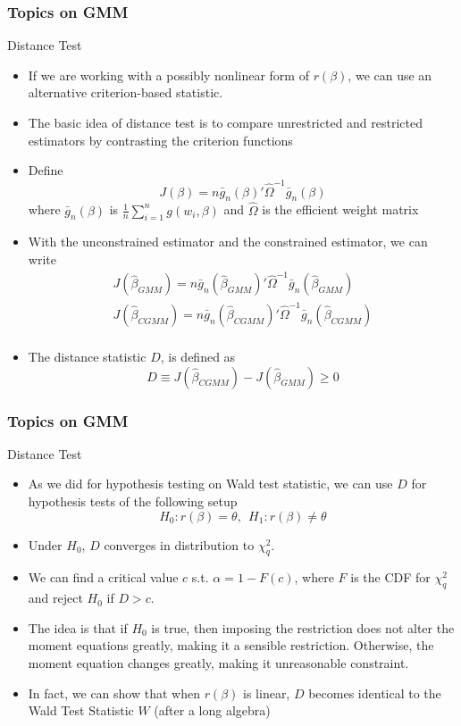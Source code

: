 \documentclass{beamer}
\begin{document}
\begin{frame}
\frametitle{Topics on GMM}
Distance Test
\begin{itemize}
\item  If we are working with a possibly nonlinear form of $r(\beta)$, we can use an alternative criterion-based statistic. 
\item The basic idea of distance test is to compare unrestricted and restricted estimators by contrasting the criterion functions
\item Define
\[
J(\beta)=n\bar{g}_n(\beta)'\widehat{\Omega}^{-1}\bar{g}_n(\beta)
\]
where $\bar{g}_n(\beta)$ is $\frac{1}{n}\sum_{i=1}^n g(w_i,\beta)$ and $\widehat{\Omega}$ is the efficient weight matrix
\item With the unconstrained estimator and the constrained estimator, we can write
\small{\begin{gather*}
J(\hat{\beta}_{GMM})=n\bar{g}_n(\hat{\beta}_{GMM})'\widehat{\Omega}^{-1}\bar{g}_n(\hat{\beta}_{GMM})\\
J(\hat{\beta}_{CGMM})=n\bar{g}_n(\hat{\beta}_{CGMM})'\widehat{\Omega}^{-1}\bar{g}_n(\hat{\beta}_{CGMM})\\
\end{gather*}}\normalsize
\item The distance statistic $D$, is defined as
\[
D\equiv J(\hat{\beta}_{CGMM})-J(\hat{\beta}_{GMM}) \geq0
\]
\end{itemize}
\end{frame}

\begin{frame}
\frametitle{Topics on GMM}
Distance Test
\begin{itemize}
\item  As we did for hypothesis testing on Wald test statistic, we can use $D$ for hypothesis tests of the following setup
\[
H_0: r(\beta)=\theta, \ \ H_1: r(\beta)\neq \theta
\]
\item Under $H_0$, $D$ converges in distribution to $\chi_q^2$. 
\item We can find a critical value $c$ s.t. $\alpha = 1-F(c)$, where $F$ is the CDF for $\chi_q^2$ and reject $H_0$ if $D>c$.
\item The idea is that if $H_0$ is true, then imposing the restriction does not alter the moment equations greatly, making it a sensible restriction. Otherwise, the moment equation changes greatly, making it unreasonable constraint. \par
\item In fact, we can show that when $r(\beta)$ is linear, $D$ becomes identical to the Wald Test Statistic $W$ (after a long algebra)
\end{itemize}
\end{frame}
\end{document}
